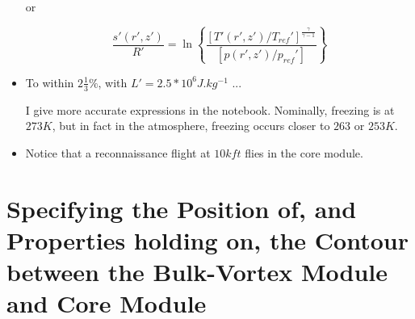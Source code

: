 \documentclass[preprint, prX]{revtex4}
\newcommand{\gogmo}{\frac{\gamma}{\gamma-1}}
\newcommand{\cbfrac}[2]{\left\{\frac{#1}{#2}\right\}}
\begin{document}
\begin{itemize}
or

\begin{equation}
	\frac{s'(r',z')}{R'} = \ln \cbfrac{ \left[ T'(r',z')/T_{ref}'\right]^\gogmo }{\left[ p(r',z')/p_{ref}' \right] }
\end{equation}

\item To within $2 \frac{1}{3} \%$, with $L' =2.5 *10^6 \si{J.kg^{-1}}$ ...

I give more accurate expressions in the notebook. Nominally, freezing is at $273 \si{K}$, but in fact in the atmosphere, freezing occurs closer to $263$ or $253 \si{K}$.

\item Notice that a reconnaissance flight at $10 \si{kft}$ flies in the core module.

\end{itemize}

\section{Specifying the Position of, and Properties holding on, the Contour between the Bulk-Vortex Module and Core Module}

\begin{figure}[h!]
	\centering
	\def\svgwidth{0.7\columnwidth}
	
\end{figure}
\end{document}

